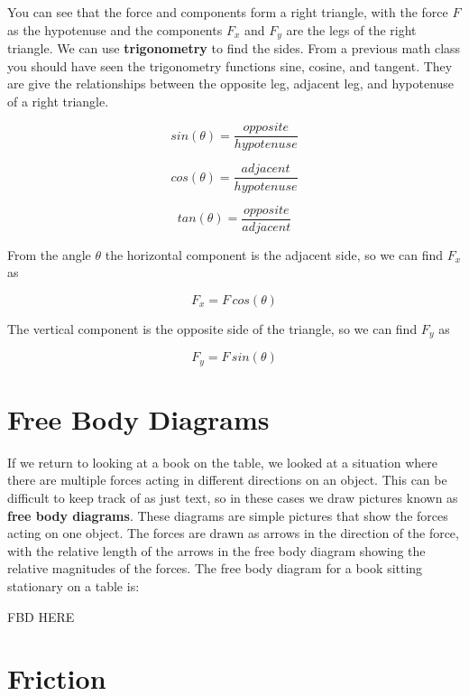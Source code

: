 \documentclass[12pt]{book}
\begin{document}
You can see that the force and components form a right triangle, with the force $F$ as the hypotenuse and the components $F_x$ and $F_y$ are the legs of the right triangle. We can use \textbf{trigonometry} to find the sides. From a previous math class you should have seen the trigonometry functions sine, cosine, and tangent. They are give the relationships between the opposite leg, adjacent leg, and hypotenuse of a right triangle.

\begin{equation}
sin(\theta) = \frac{opposite}{hypotenuse}
\end{equation}

\begin{equation}
cos(\theta) = \frac{adjacent}{hypotenuse}
\end{equation}

\begin{equation}
tan(\theta) = \frac{opposite}{adjacent}
\end{equation}

From the angle $\theta$ the horizontal component is the adjacent side, so we can find $F_x$ as

\begin{equation}
F_x = F \, cos(\theta)
\end{equation}

The vertical component is the opposite side of the triangle, so we can find $F_y$ as

\begin{equation}
F_y = F \, sin(\theta)
\end{equation}

\section{Free Body Diagrams}

If we return to looking at a book on the table, we looked at a situation where there are multiple forces acting in different directions on an object. This can be difficult to keep track of as just text, so in these cases we draw pictures known as \textbf{free body diagrams}. These diagrams are simple pictures that show the forces acting on one object. The forces are drawn as arrows in the direction of the force, with the relative length of the arrows in the free body diagram showing the relative magnitudes of the forces. The free body diagram for a book sitting stationary on a table is:

FBD HERE

\section{Friction}
\end{document}
